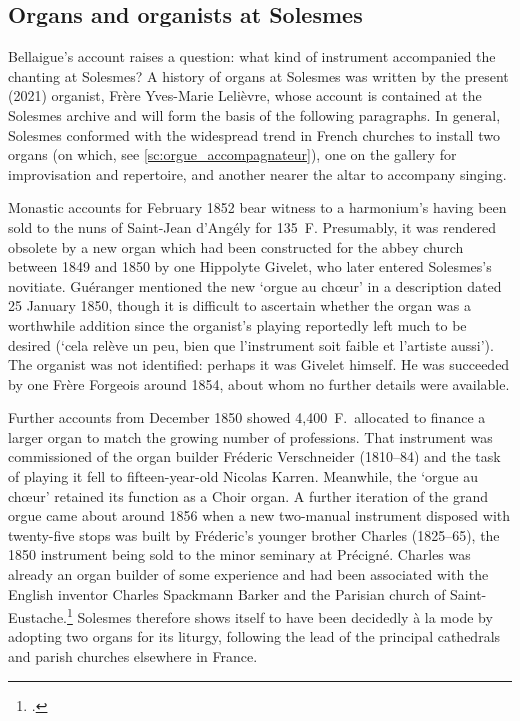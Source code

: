 \subsection{Organs and organists at Solesmes}
Bellaigue's account raises a question: what kind of instrument accompanied the chanting at Solesmes?
A history of organs at Solesmes was written by the present (2021) organist, Frère Yves-Marie Lelièvre, whose account is contained at the Solesmes archive and will form the basis of the following paragraphs.
In general, Solesmes conformed with the widespread trend in French churches to install two organs (on which, see \cref{sc:orgue_accompagnateur}), one on the gallery for improvisation and repertoire, and another nearer the altar to accompany singing.

Monastic accounts for February 1852 bear witness to a harmonium's having been sold to the nuns of Saint-Jean d'Angély for 135~F.
Presumably, it was rendered obsolete by a new organ which had been constructed for the abbey church between 1849 and 1850 by one Hippolyte Givelet, who later entered Solesmes's novitiate.
Guéranger mentioned the new `orgue au chœur' in a description dated 25 January 1850, though it is difficult to ascertain whether the organ was a worthwhile addition since the organist's playing reportedly left much to be desired (`cela relève un peu, bien que l'instrument soit faible et l'artiste aussi').
The organist was not identified: perhaps it was Givelet himself.
He was succeeded by one Frère Forgeois around 1854, about whom no further details were available.

Further accounts from December 1850 showed 4,400~F.\ allocated to finance a larger organ to match the growing number of professions.
That instrument was commissioned of the organ builder Fréderic Verschneider (1810--84) and the task of playing it fell to fifteen-year-old Nicolas Karren.
Meanwhile, the `orgue au chœur' retained its function as a Choir organ.
A further iteration of the grand orgue came about around 1856 when a new two-manual instrument disposed with twenty-five stops was built by Fréderic's younger brother Charles (1825--65), the 1850 instrument being sold to the minor seminary at Précigné.
Charles was already an organ builder of some experience and had been associated with the English inventor Charles Spackmann Barker and the Parisian church of Saint-Eustache.\footcite[pp.~255--6 \S{}10 n.~3]{OchseOrganistsOrganPlaying2000}
Solesmes therefore shows itself to have been decidedly à la mode by adopting two organs for its liturgy, following the lead of the principal cathedrals and parish churches elsewhere in France.
\nowidow[2]

